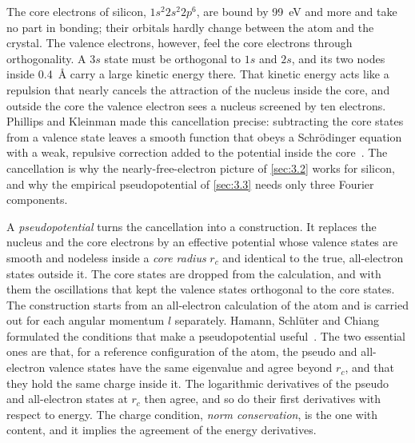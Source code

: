 The core electrons of silicon, $1s^2 2s^2 2p^6$, are bound by \SI{99}{eV} and more and take no part in bonding; their orbitals hardly change between the atom and the crystal. The valence electrons, however, feel the core electrons through orthogonality. A $3s$ state must be orthogonal to $1s$ and $2s$, and its two nodes inside \SI{0.4}{\angstrom} carry a large kinetic energy there. That kinetic energy acts like a repulsion that nearly cancels the attraction of the nucleus inside the core, and outside the core the valence electron sees a nucleus screened by ten electrons. Phillips and Kleinman made this cancellation precise: subtracting the core states from a valence state leaves a smooth function that obeys a Schr\"odinger equation with a weak, repulsive correction added to the potential inside the core~\cite{phillips1959new}. The cancellation is why the nearly-free-electron picture of \cref{sec:3.2} works for silicon, and why the empirical pseudopotential of \cref{sec:3.3} needs only three Fourier components.

A \emph{pseudopotential} turns the cancellation into a construction. It replaces the nucleus and the core electrons by an effective potential whose valence states are smooth and nodeless inside a \emph{core radius} $r_c$ and identical to the true, all-electron states outside it. The core states are dropped from the calculation, and with them the oscillations that kept the valence states orthogonal to the core states. The construction starts from an all-electron calculation of the atom and is carried out for each angular momentum $l$ separately. Hamann, Schl\"uter and Chiang formulated the conditions that make a pseudopotential useful~\cite{hamann1979norm}. The two essential ones are that, for a reference configuration of the atom, the pseudo and all-electron valence states have the same eigenvalue and agree beyond $r_c$, and that they hold the same charge inside it. The logarithmic derivatives of the pseudo and all-electron states at $r_c$ then agree, and so do their first derivatives with respect to energy. The charge condition, \emph{norm conservation}, is the one with content, and it implies the agreement of the energy derivatives.

